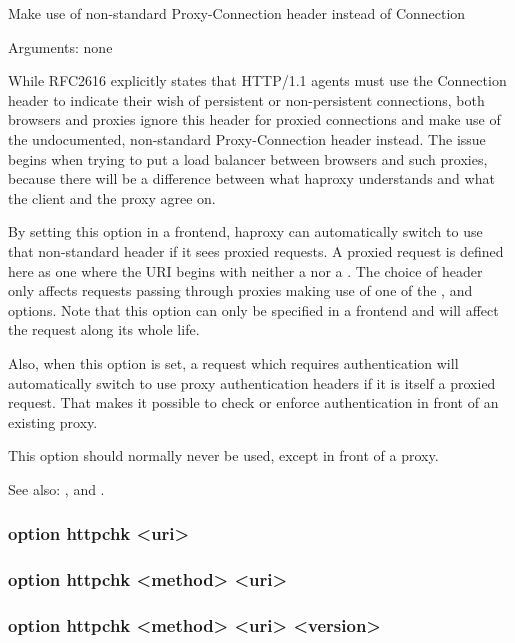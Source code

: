 
  Make use of non-standard Proxy-Connection header instead of Connection


  Arguments: none

  While RFC2616 explicitly states that HTTP/1.1 agents must use the
  Connection header to indicate their wish of persistent or non-persistent
  connections, both browsers and proxies ignore this header for proxied
  connections and make use of the undocumented, non-standard Proxy-Connection
  header instead. The issue begins when trying to put a load balancer between
  browsers and such proxies, because there will be a difference between what
  haproxy understands and what the client and the proxy agree on.

  By setting this option in a frontend, haproxy can automatically switch to use
  that non-standard header if it sees proxied requests. A proxied request is
  defined here as one where the URI begins with neither a \chr{/} nor a \chr{*}. The
  choice of header only affects requests passing through proxies making use of
  one of the ,  and  options. Note
  that this option can only be specified in a frontend and will affect the
  request along its whole life.

  Also, when this option is set, a request which requires authentication will
  automatically switch to use proxy authentication headers if it is itself a
  proxied request. That makes it possible to check or enforce authentication in
  front of an existing proxy.

  This option should normally never be used, except in front of a proxy.

See also: ,  and .


\subsubsection[httpchk]{}
\subsubsection*{option httpchk <uri>}
\subsubsection*{option httpchk <method> <uri>}
\subsubsection*{option httpchk <method> <uri> <version>}

